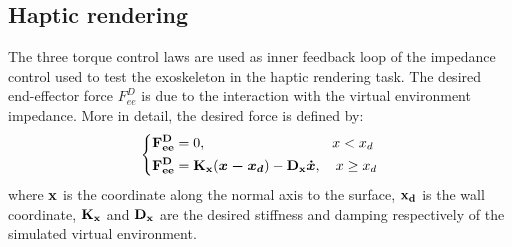 %


\subsection{Haptic rendering} \label{sub:impedanceCJICF}

The three torque control laws are used as inner feedback loop of the impedance control used to test the exoskeleton in the haptic rendering task. The desired end-effector force $F_{ee}^D$ is due to the interaction with the virtual environment impedance. More in detail, the desired force is defined by:
%
\begin{equation}
\label{eq:desiredVE}
\left \{
\begin{aligned}
& \vect{ F_{ee}^D} = 0, \ \ \ \quad \quad \quad \quad \quad \quad \quad \quad  x < x_d \\
& \vect{F_{ee}^D} = \vectm{K_x} (\vects{x - x_d}) - \vectm{D_x}\vects{\dot{x}}, \quad  x \geq x_d  \\
\end{aligned}
\right .
\end{equation}
%
%
%
where $\mathbf{x}$ is the coordinate along the normal axis to the surface, $\mathbf{x_d}$   is the wall coordinate, $\mathbf{K_x}$ and $\mathbf{D_x}$ are the desired stiffness and damping respectively of the simulated virtual environment.

